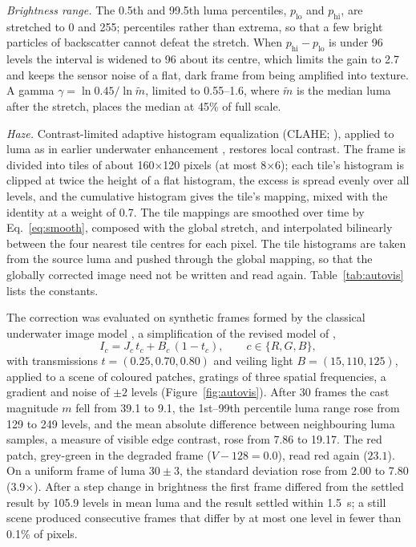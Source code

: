 \documentclass[a4paper,fleqn]{cas-sc}
\begin{document}
\emph{Brightness range.} The 0.5th and 99.5th luma percentiles, $p_\mathrm{lo}$ and
$p_\mathrm{hi}$, are stretched to 0 and 255; percentiles rather than extrema, so that
a few bright particles of backscatter cannot defeat the stretch. When
$p_\mathrm{hi} - p_\mathrm{lo}$ is under 96 levels the interval is widened to 96 about
its centre, which limits the gain to 2.7 and keeps the sensor noise of a flat, dark
frame from being amplified into texture. A gamma $\gamma = \ln 0.45 / \ln \tilde m$,
limited to 0.55--1.6, where $\tilde m$ is the median luma after the stretch, places
the median at 45\% of full scale.

\emph{Haze.} Contrast-limited adaptive histogram equalization (CLAHE;
\citealp{pizer1987,zuiderveld1994}), applied to luma as in earlier underwater
enhancement \citep{hitam2013}, restores local contrast. The frame is divided into
tiles of about 160$\times$120 pixels (at most 8$\times$6); each tile's histogram is
clipped at twice the height of a flat histogram, the excess is spread evenly over all
levels, and the cumulative histogram gives the tile's mapping, mixed with the identity
at a weight of 0.7. The tile mappings are smoothed over time by Eq.~\eqref{eq:smooth},
composed with the global stretch, and interpolated bilinearly between the four nearest
tile centres for each pixel. The tile histograms are taken from the source luma and
pushed through the global mapping, so that the globally corrected image need not be
written and read again. Table~\ref{tab:autovis} lists the constants.

The correction was evaluated on synthetic frames formed by the classical underwater
image model \citep{jaffe1990}, a simplification of the revised model of
\citet{akkaynak2018},
\begin{equation}\label{eq:water}
  I_c = J_c\,t_c + B_c\,(1 - t_c), \qquad c \in \{R, G, B\},
\end{equation}
with transmissions $t = (0.25, 0.70, 0.80)$ and veiling light $B = (15, 110, 125)$,
applied to a scene of coloured patches, gratings of three spatial frequencies, a
gradient and noise of $\pm 2$ levels (Figure~\ref{fig:autovis}). After 30 frames the
cast magnitude $m$ fell from 39.1 to 9.1, the 1st--99th percentile luma range rose
from 129 to 249 levels, and the mean absolute difference between neighbouring luma
samples, a measure of visible edge contrast, rose from 7.86 to 19.17. The red patch,
grey-green in the degraded frame ($V - 128 = 0.0$), read red again ($23.1$). On a
uniform frame of luma $30 \pm 3$, the standard deviation rose from 2.00 to 7.80
(3.9$\times$). After a step change in brightness the first frame differed from the
settled result by 105.9 levels in mean luma and the result settled within 1.5~s; a
still scene produced consecutive frames that differ by at most one level in fewer than
0.1\% of pixels.
\end{document}
